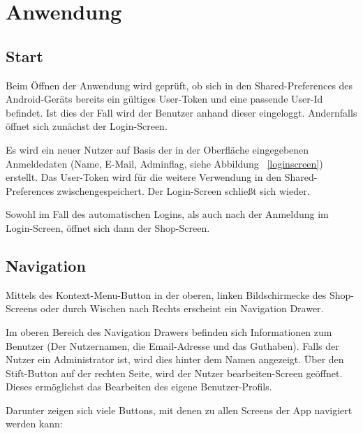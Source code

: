 \section{Anwendung}\label{sec:features}

\subsection{Start}\label{subsec:start}

Beim Öffnen der Anwendung wird geprüft, ob sich in den Shared-Preferences des Android-Geräts bereits ein gültiges User-Token und eine passende User-Id befindet.
Ist dies der Fall wird der Benutzer anhand dieser eingeloggt.
Andernfalls öffnet sich zunächst der Login-Screen.

Es wird ein neuer Nutzer auf Basis der in der Oberfläche eingegebenen Anmeldedaten (Name, E-Mail, Adminflag, siehe Abbildung ~\ref{loginscreen}) erstellt.
Das User-Token wird für die weitere Verwendung in den Shared-Preferences zwischengespeichert.
Der Login-Screen schließt sich wieder.

Sowohl im Fall des automatischen Logins, als auch nach der Anmeldung im Login-Screen, öffnet sich dann der Shop-Screen.


\subsection{Navigation} \label{subsec:navigation}

Mittels des Kontext-Menu-Button in der oberen, linken Bildschirmecke des Shop-Screens oder durch Wischen nach Rechts erscheint ein Navigation Drawer.

Im oberen Bereich des Navigation Drawers befinden sich Informationen zum Benutzer (Der Nutzernamen, die Email-Adresse und das Guthaben).
Falls der Nutzer ein Administrator ist, wird dies hinter dem Namen angezeigt.
Über den Stift-Button auf der rechten Seite, wird der Nutzer bearbeiten-Screen geöffnet.
Dieses ermöglichst das Bearbeiten des eigene Benutzer-Profils.

Darunter zeigen sich viele Buttons, mit denen zu allen Screens der App navigiert werden kann:

